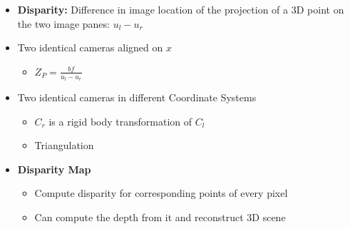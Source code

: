\documentclass[a4paper]{article}
\newcommand{\ides}[1]{\item \textbf{#1}}
\begin{document}
\begin{itemize}
    \ides{Disparity:} Difference in image location of the projection of a 3D point on the two image panes: $u_l - u_r$
    \item Two identical cameras aligned on $x$
        \begin{itemize}
            \item $Z_P = \frac{bf}{u_l - u_r}$
        \end{itemize}
    \item Two identical cameras in different Coordinate Systems
        \begin{itemize}
            \item $C_r$ is a rigid body transformation of $C_l$\\
            \item Triangulation
        \end{itemize}
    \ides{Disparity Map}
        \begin{itemize}
            \item Compute disparity for corresponding points of every pixel
            \item Can compute the depth from it and reconstruct 3D scene
        \end{itemize}
\end{itemize}
\end{document}
